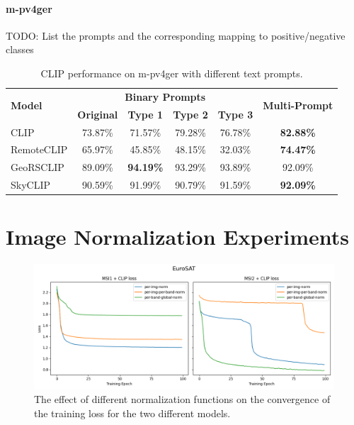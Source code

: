 \documentclass[a4paper, oneside, english]{sapthesis} %
\begin{document}
\paragraph{m-pv4ger}

TODO: List the prompts and the corresponding mapping to positive/negative classes


\begin{table}[ht]
\centering
\footnotesize
\renewcommand{\arraystretch}{1.2} %
    \begin{tabular}{lc|cccc}
    \toprule
    \multirow{2}{*}{\textbf{Model}} & \multicolumn{4}{c}{\textbf{Binary Prompts}} &  \multirow{2}{*}{\textbf{Multi-Prompt}}\\
    \cmidrule(lr){2-5}
    & \textbf{Original} & \textbf{Type 1} & \textbf{Type 2} & \textbf{Type 3} \\
    \midrule
    CLIP & 73.87\% & 71.57\% & 79.28\% & 76.78\% & \textbf{82.88\%} \\
    RemoteCLIP & 65.97\% & 45.85\% & 48.15\% & 32.03\% & \textbf{74.47\%} \\
    GeoRSCLIP & 89.09\% & \textbf{94.19\%} & 93.29\% & 93.89\% & 92.09\% \\
    SkyCLIP & 90.59\% & 91.99\% & 90.79\% & 91.59\% & \textbf{92.09\%} \\
    \bottomrule
    \end{tabular}
\vspace{0.3cm}
\caption{\normalsize CLIP performance on m-pv4ger with different text prompts.}
\label{tab:prompts2}
\end{table}


\section{Image Normalization Experiments}

\begin{figure}[h]
    \centering
    \includegraphics[width=\textwidth]{img/EuroSAT_norm_losses_plot.png}
    \caption{The effect of different normalization functions on the convergence of the training loss for the two different models.}
    \label{fig:normlosses}
\end{figure}
\end{document}
